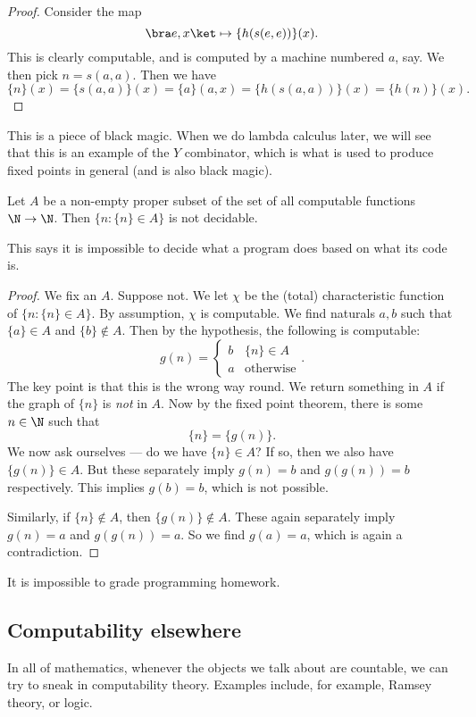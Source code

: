 \documentclass[a4paper]{article}
\begin{document}
\begin{proof}
  Consider the map
  \[
    \bra e, x\ket \mapsto \{h(s(e, e))\}(x).
  \]
  This is clearly computable, and is computed by a machine numbered $a$, say. We then pick $n = s(a, a)$. Then we have
  \[
    \{n\}(x) = \{s(a, a)\}(x) = \{a\}(a, x) = \{h(s(a, a))\}(x) = \{h(n)\}(x).
  \]
\end{proof}
This is a piece of black magic. When we do lambda calculus later, we will see that this is an example of the $Y$ combinator, which is what is used to produce fixed points in general (and is also black magic).

\begin{thm}
  Let $A$ be a non-empty proper subset of the set of all computable functions $\N \to \N$. Then $\{n: \{n\} \in A\}$ is not decidable.
\end{thm}
This says it is impossible to decide what a program does based on what its code is.

\begin{proof}
  We fix an $A$. Suppose not. We let $\chi$ be the (total) characteristic function of $\{n: \{n\} \in A\}$. By assumption, $\chi$ is computable. We find naturals $a, b$ such that $\{a\} \in A$ and $\{b\} \not\in A$. Then by the hypothesis, the following is computable:
  \[
    g(n) =
    \begin{cases}
      b & \{n\} \in A\\
      a & \text{otherwise}
    \end{cases}.
  \]
  The key point is that this is the wrong way round. We return something in $A$ if the graph of $\{n\}$ is \emph{not} in $A$. Now by the fixed point theorem, there is some $n \in \N$ such that
  \[
    \{n\} = \{g(n)\}.
  \]
  We now ask ourselves --- do we have $\{n\} \in A$? If so, then we also have $\{g(n)\} \in A$. But these separately imply $g(n) = b$ and $g(g(n)) = b$ respectively. This implies $g(b) = b$, which is not possible.

  Similarly, if $\{n\} \not \in A$, then $\{g(n)\} \not \in A$. These again separately imply $g(n) = a$ and $g(g(n)) = a$. So we find $g(a) = a$, which is again a contradiction.
\end{proof}

\begin{cor}
  It is impossible to grade programming homework.
\end{cor}

\subsection{Computability elsewhere}
In all of mathematics, whenever the objects we talk about are countable, we can try to sneak in computability theory. Examples include, for example, Ramsey theory, or logic.
\end{document}
